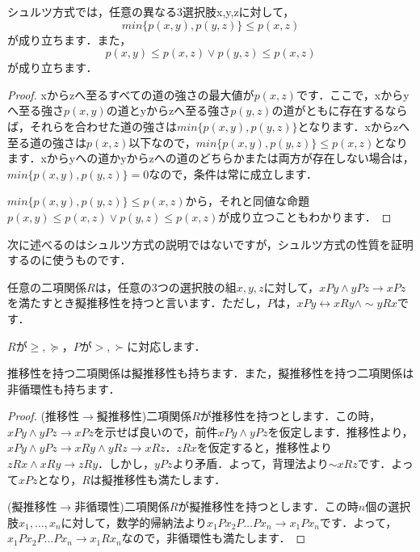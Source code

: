 \begin{lem}
    シュルツ方式では，任意の異なる3選択肢x,y,zに対して，
    \begin{equation*}
        min\{p(x,y),p(y,z)\} \leq p(x,z)
    \end{equation*}
    が成り立ちます．また，
    \begin{equation*}
        p(x,y) \leq p(x,z) \lor p(y,z) \leq p(x,z)
    \end{equation*}
    が成り立ちます．
\end{lem}
\begin{proof}
xからzへ至るすべての道の強さの最大値が$p(x,z)$です．ここで，xからyへ至る強さ$p(x,y)$の道とyからzへ至る強さ$p(y,z)$の道がともに存在するならば，それらを合わせた道の強さは$min\{p(x,y),p(y,z)\}$となります．xからzへ至る道の強さは$p(x,z)$以下なので，$min\{p(x,y),p(y,z)\} \leq p(x,z)$となります．xからyへの道かyからzへの道のどちらかまたは両方が存在しない場合は，$min\{p(x,y),p(y,z)\} = 0$なので，条件は常に成立します．

$min\{p(x,y),p(y,z)\} \leq p(x,z)$から，それと同値な命題$p(x,y) \leq p(x,z) \lor p(y,z) \leq p(x,z)$が成り立つこともわかります．
\end{proof}

次に述べるのはシュルツ方式の説明ではないですが，シュルツ方式の性質を証明するのに使うものです．
\begin{dfn}[擬推移性]
    任意の二項関係$R$は，任意の3つの選択肢の組$x,y,z$に対して，$xPy \land yPz \to xPz$を満たすとき擬推移性を持つと言います．ただし，$P$は，$xPy \leftrightarrow xRy \land \sim yRx$です．
\end{dfn}
$R$が$\geq,\succeq$，$P$が$>,\succ$に対応します．
\begin{lem}
    推移性を持つ二項関係は擬推移性も持ちます．また，擬推移性を持つ二項関係は非循環性も持ちます．
\end{lem}
\begin{proof}
(推移性$\to$擬推移性)二項関係$R$が推移性を持つとします．この時，$xPy \land yPz \to xPz$を示せば良いので，前件$xPy \land yPz$を仮定します．推移性より，$xPy \land yPz \to xRy \land yRz \to xRz$．$zRx$を仮定すると，推移性より$zRx \land xRy \to zRy$．しかし，$yPz$より矛盾．よって，背理法より$\sim xRz$です．よって$xPz$となり，$R$は擬推移性も満たします．

(擬推移性$\to$非循環性)二項関係$R$が擬推移性を持つとします．この時$n$個の選択肢$x_1,\dots,x_n$に対して，数学的帰納法より$x_1 P x_2 P \dots P x_n \to x_1 P x_n$です．よって，$x_1 P x_2 P \dots P x_n \to x_1 R x_n$なので，非循環性も満たします．
\end{proof}


